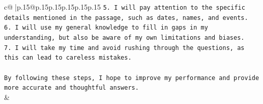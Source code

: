 \documentclass{article}
\begin{document}
{\begin{supertabular}{c@{$\;$}|p{.15\linewidth}@{}p{.15\linewidth}p{.15\linewidth}p{.15\linewidth}p{.15\linewidth}p{.15\linewidth}}
{{{\texttt{5. I will pay attention to the specific details mentioned in the passage, such as dates, names, and events.} \\
\texttt{6. I will use my general knowledge to fill in gaps in my understanding, but also be aware of my own limitations and biases.} \\
\texttt{7. I will take my time and avoid rushing through the questions, as this can lead to careless mistakes.} \\
\\ 
\texttt{By following these steps, I hope to improve my performance and provide more accurate and thoughtful answers.} \\
            }
        }
    }
    & \\ \\

\end{supertabular}
}
\end{document}
